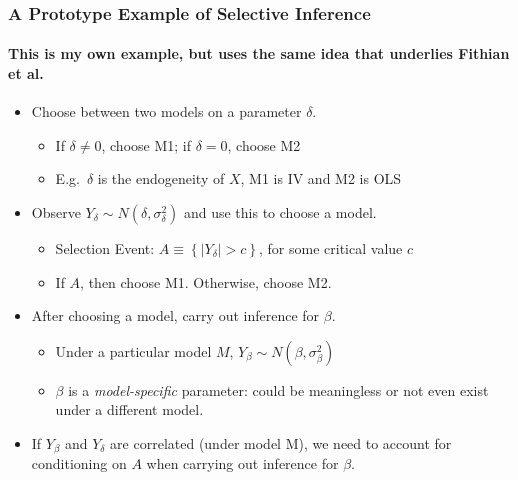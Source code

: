 \begin{frame}
  \frametitle{A Prototype Example of Selective Inference}
  \framesubtitle{This is my own example, but uses the same idea that underlies Fithian et al.}

  \footnotesize
 
  \begin{itemize}
    \item Choose between two models on a parameter $\delta$. 
      \begin{itemize} 
  \footnotesize
        \item If $\delta \neq 0$, choose M1; if $\delta = 0$, choose M2
        \item E.g.\ $\delta$ is the endogeneity of $X$, M1 is IV and M2 is OLS
  \end{itemize}
\item Observe $Y_\delta \sim N(\delta, \sigma_\delta^2)$ and use this to choose a model.
  \begin{itemize}
  \footnotesize
    \item Selection Event: $A \equiv \left\{ |Y_\delta| >c \right\}$, for some critical value $c$ 
    \item If $A$, then choose M1. Otherwise, choose M2.
  \end{itemize}
\item After choosing a model, carry out inference for $\beta$.
  \begin{itemize}
  \footnotesize
    \item Under a particular model $M$, $Y_\beta \sim N(\beta,\sigma_\beta^2)$
    \item $\beta$ is a \emph{model-specific} parameter: could be meaningless or not even exist under a different model.
  \end{itemize}
\item If $Y_\beta$ and $Y_\delta$ are correlated (under model M), we need to account for conditioning on $A$ when carrying out inference for $\beta$.

  \end{itemize}

\end{frame}
